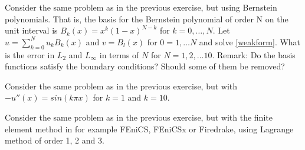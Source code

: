 \begin{exercise}
Consider the same problem as in the previous exercise, but using Bernstein polynomials. 
That is, the basis for the Bernstein polynomial of order N on the unit interval is $B_k(x)=x^k(1-x)^{N-k}$ for $k=0, \ldots, N$.  
Let $u=\sum_{k=0}^{N} u_k B_k(x )$ and $v=B_l(x)$ for $0=1, \ldots N$
and solve \eqref{weakform}. What is the error in $L_2$ and $L_\infty$ in terms of $N$ for $N=1, 2, \ldots 10$. Remark: Do the
basis functions satisfy the boundary conditions? Should some of them be removed?  
\end{exercise}

\begin{exercise}
Consider the same problem as in the previous exercise, but with  
$-u''(x) = sin(k \pi x)$ for $k=1$ and $k=10$.  
\end{exercise}

\begin{exercise}
Consider the same problem as in the previous exercise, but
with the finite element method in for example FEniCS, FEniCSx or Firedrake, using Lagrange 
method of order 1, 2 and 3. 

\end{exercise}











